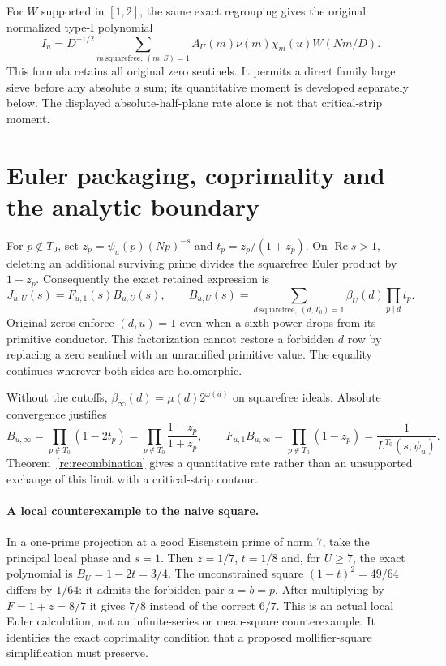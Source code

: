 \documentclass[11pt]{article}
\theoremstyle{definition}\newtheorem{definition}[theorem]{Definition}
\theoremstyle{remark}\newtheorem{remark}[theorem]{Remark}
\begin{document}
For $W$ supported in $[1,2]$, the same exact regrouping gives the
original normalized type-I polynomial
\[
 I_u=D^{-1/2}\sum_{m\ \mathrm{squarefree},\ (m,S)=1}
 A_U(m)\nu(m)\chi_m(u)W(Nm/D).
\]
This formula retains all original zero sentinels. It permits a direct
family large sieve before any absolute $d$ sum; its quantitative moment
is developed separately below. The displayed absolute-half-plane rate
alone is not that critical-strip moment.

\section{Euler packaging, coprimality and the analytic boundary}
\label{rc:details}
For $p\notin T_0$, set $z_p=\psi_u(p)(Np)^{-s}$ and
$t_p=z_p/(1+z_p)$. On $\operatorname{Re}s>1$, deleting an additional
surviving prime divides the squarefree Euler product by $1+z_p$.
Consequently the exact retained expression is
\[
 J_{u,U}(s)=F_{u,1}(s)B_{u,U}(s),\qquad
 B_{u,U}(s)=\sum_{d\ \mathrm{squarefree},\ (d,T_0)=1}
                 \beta_U(d)\prod_{p\mid d}t_p.
\]
Original zeros enforce $(d,u)=1$ even when a sixth power drops from
its primitive conductor. This factorization cannot restore a forbidden
$d$ row by replacing a zero sentinel with an unramified primitive value.
The equality continues wherever both sides are holomorphic.

Without the cutoffs, $\beta_\infty(d)=\mu(d)2^{\omega(d)}$ on
squarefree ideals. Absolute convergence justifies
\[
 B_{u,\infty}=\prod_{p\notin T_0}(1-2t_p)
 =\prod_{p\notin T_0}\frac{1-z_p}{1+z_p},\qquad
 F_{u,1}B_{u,\infty}=\prod_{p\notin T_0}(1-z_p)
                   =\frac1{L^{T_0}(s,\psi_u)}.
\]
Theorem~\ref{rc:recombination} gives a quantitative rate rather than an
unsupported exchange of this limit with a critical-strip contour.

\paragraph{A local counterexample to the naive square.}
In a one-prime projection at a good Eisenstein prime of norm $7$, take
the principal local phase and $s=1$. Then $z=1/7$, $t=1/8$ and,
for $U\ge7$, the exact polynomial is $B_U=1-2t=3/4$.
The unconstrained square $(1-t)^2=49/64$ differs by $1/64$:
it admits the forbidden pair $a=b=p$. After multiplying by
$F=1+z=8/7$ it gives $7/8$ instead of the correct $6/7$.
This is an actual local Euler calculation, not an infinite-series or
mean-square counterexample. It identifies the exact coprimality condition
that a proposed mollifier-square simplification must preserve.
\end{document}
